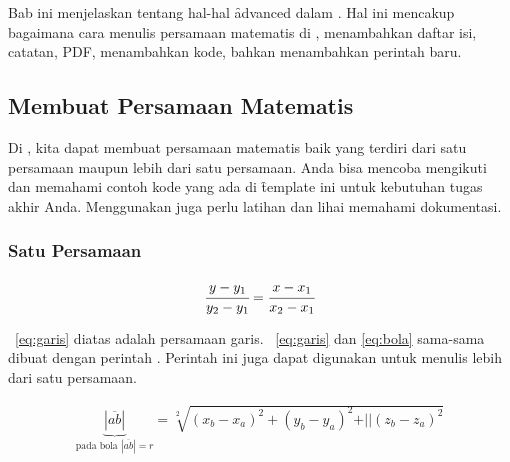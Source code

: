 \chapter{\babTiga}
Bab ini menjelaskan tentang hal-hal \f{advanced} dalam \latex. Hal ini mencakup bagaimana cara menulis persamaan matematis di \latex, menambahkan daftar isi, catatan, PDF, menambahkan kode, bahkan menambahkan perintah baru.



\section{Membuat Persamaan Matematis}
Di \latex, kita dapat membuat persamaan matematis baik yang terdiri dari satu persamaan maupun lebih dari satu persamaan. Anda bisa mencoba mengikuti dan memahami contoh kode yang ada di \f{template} ini untuk kebutuhan tugas akhir Anda. Menggunakan \latex juga perlu latihan dan lihai memahami dokumentasi.

\subsection{Satu Persamaan}

\noindent \begin{align}\label{eq:garis}
	\cfrac{y - y_{1}}{y_{2} - y_{1}} = 
	\cfrac{x - x_{1}}{x_{2} - x_{1}}
\end{align}

\equ~\ref{eq:garis} diatas adalah persamaan garis. 
\equ~\ref{eq:garis} dan \ref{eq:bola} sama-sama dibuat dengan perintah . 
Perintah ini juga dapat digunakan untuk menulis lebih dari satu persamaan. 

\noindent \begin{align}\label{eq:bola}
	\underbrace{|\overline{ab}|}_{\text{pada bola $|\overline{ab}| = r$}} 
	= \sqrt[2]{(x_{b} - x_{a})^{2} + (y_{b} - y_{a})^{2} + 
		\vert\vert(z_{b} - z_{a})^{2}}
\end{align}

